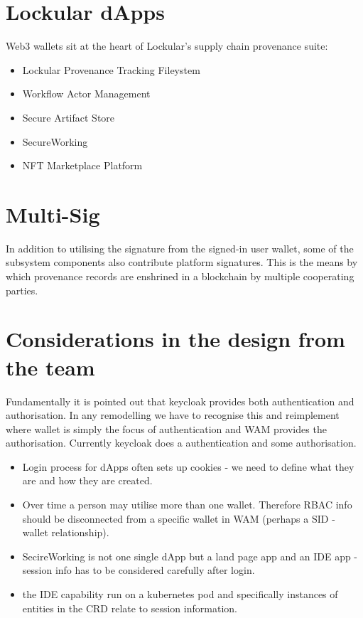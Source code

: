 \documentclass{tufte-handout}
\begin{document}
 \section{Lockular dApps}\label{sec:page-layout}
 Web3 wallets sit at the heart of Lockular's supply chain provenance suite:
 \begin{itemize}
    \item Lockular Provenance Tracking Fileystem
    \item Workflow Actor Management
    \item Secure Artifact Store
    \item SecureWorking
    \item NFT Marketplace Platform
 \end{itemize}

 \section{Multi-Sig}\label{sec:page-layout}
 In addition to utilising the signature from the signed-in user wallet, some of the subsystem components also contribute platform signatures. This is the means by which provenance records
 are enshrined in a blockchain by multiple cooperating parties.

 \section{Considerations in the design from the team}
 Fundamentally it is pointed out that keycloak provides both authentication and authorisation. In any remodelling we have to recognise this and reimplement where wallet is simply
 the focus of authentication and WAM provides the authorisation. Currently keycloak does a authentication and some authorisation.
 \begin{itemize}
    \item Login process for dApps often sets up cookies - we need to define what they are and how they are created.
    \item Over time a person may utilise more than one wallet. Therefore RBAC info should be disconnected from a specific wallet in WAM (perhaps a SID - wallet relationship).
    \item SecireWorking is not one single dApp but a land page app and an IDE app - session info has to be considered carefully after login.
    \item the IDE capability run on a kubernetes pod and specifically instances of entities in the CRD relate to session information.
 \end{itemize}


\end{document}
